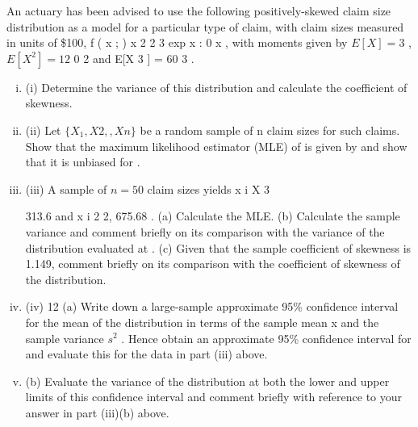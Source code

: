 \documentclass[a4paper,12pt]{article}
\begin{document}
An actuary has been advised to use the following positively-skewed claim size distribution as a model for a particular type of claim, with claim sizes measured in units of \$100,
f ( x ; )
x 2
2
3
exp
x
: 0
x
,
with moments given by $E[X] = 3$ , $E[X^2 ] = 12$
0
2
and E[X 3 ] = 60 3 .
\begin{enumerate}[(i)]
\item (i) Determine the variance of this distribution and calculate the coefficient of skewness.
\item  (ii) Let $\{X_1 , X 2 ,, X n\}$ be a random sample of n claim sizes for such claims. Show that the maximum likelihood estimator (MLE) of is given by
and show that it is unbiased for .
\item (iii)
A sample of $n = 50$ claim sizes yields x i
X
3

313.6 and x i 2
2, 675.68 .
(a) Calculate the MLE.
(b) Calculate the sample variance and comment briefly on its comparison with the variance of the distribution evaluated at .
(c) Given that the sample coefficient of skewness is 1.149, comment briefly on its comparison with the coefficient of skewness of the distribution.
%
\item (iv)
12
(a) Write down a large-sample approximate 95\% confidence interval for the mean of the distribution in terms of the sample mean x and the sample variance $s^2$ . Hence obtain an approximate 95\% confidence interval for and evaluate this for the data in part (iii) above.
\item 
(b) Evaluate the variance of the distribution at both the lower and upper limits of this confidence interval and comment briefly with reference to your answer in part (iii)(b) above.
\end{enumerate}
\end{document}
